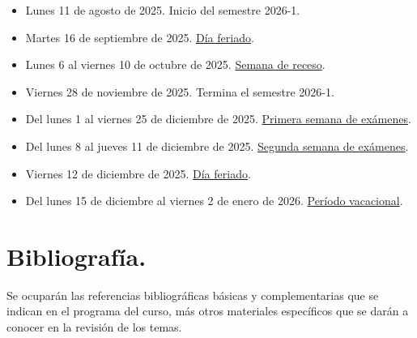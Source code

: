 \documentclass[12pt]{article}
\numberwithin{equation}{section}
\begin{document}
\begin{itemize}
\item Lunes 11 de agosto de 2025. Inicio del semestre 2026-1.
\item Martes 16 de septiembre de 2025. \underline{Día feriado}.
\item Lunes 6 al viernes 10 de octubre de 2025. \underline{Semana de receso}.
\item Viernes 28 de noviembre de 2025. Termina el semestre 2026-1.
\item Del lunes 1 al viernes 25 de diciembre de 2025. \underline{Primera semana de exámenes}.
\item Del lunes 8 al jueves 11 de diciembre de 2025. \underline{Segunda semana de exámenes}.
\item Viernes 12 de diciembre de 2025. \underline{Día feriado}.
\item Del lunes 15 de diciembre al viernes 2 de enero de 2026. \underline{Período vacacional}.
\end{itemize}

\newpage

\section{Bibliografía.}

Se ocuparán las referencias bibliográficas básicas y complementarias que se indican en el programa del curso, más otros materiales específicos que se darán a conocer en la revisión de los temas.

\nocite{*}
\printbibliography[title=Referencias para el curso.]
\end{document}
